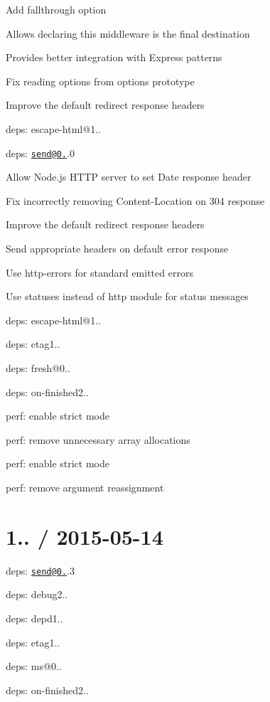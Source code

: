 \begin{DoxyItemize}
\item Add {\ttfamily fallthrough} option
\begin{DoxyItemize}
\item Allows declaring this middleware is the final destination
\item Provides better integration with Express patterns
\end{DoxyItemize}
\item Fix reading options from options prototype
\item Improve the default redirect response headers
\item deps\+: escape-\/html@1..
\item deps\+: \href{mailto:send@0.13}{\tt send@0.}.0
\begin{DoxyItemize}
\item Allow Node.\+js H\+T\+TP server to set {\ttfamily Date} response header
\item Fix incorrectly removing {\ttfamily Content-\/\+Location} on 304 response
\item Improve the default redirect response headers
\item Send appropriate headers on default error response
\item Use {\ttfamily http-\/errors} for standard emitted errors
\item Use {\ttfamily statuses} instead of {\ttfamily http} module for status messages
\item deps\+: escape-\/html@1..
\item deps\+: etag1..
\item deps\+: fresh@0..
\item deps\+: on-\/finished2..
\item perf\+: enable strict mode
\item perf\+: remove unnecessary array allocations
\end{DoxyItemize}
\item perf\+: enable strict mode
\item perf\+: remove argument reassignment
\end{DoxyItemize}

\section*{1.. / 2015-\/05-\/14 }


\begin{DoxyItemize}
\item deps\+: \href{mailto:send@0.12}{\tt send@0.}.3
\begin{DoxyItemize}
\item deps\+: debug2..
\item deps\+: depd1..
\item deps\+: etag1..
\item deps\+: ms@0..
\item deps\+: on-\/finished2..
\end{DoxyItemize}
\end{DoxyItemize}

